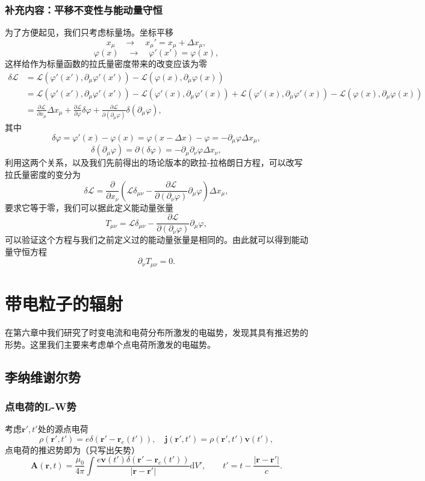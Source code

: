 \documentclass[UTF8]{ctexbook}
\renewcommand{\d}{\mathrm{d}}
\renewcommand{\b}{\boldsymbol}
\numberwithin{equation}{chapter}
\begin{document}
	\subsection{补充内容：平移不变性与能动量守恒}
	为了方便起见，我们只考虑标量场。坐标平移
	\[x_\mu\quad \rightarrow \quad x_\mu'=x_\mu + \Delta x_\mu , \]
	\[\varphi(x)\quad\rightarrow\quad \varphi'(x')=\varphi(x), \]
	这样给作为标量函数的拉氏量密度带来的改变应该为零
	\begin{align*}
		\delta \mathcal{L}&=\mathcal{L}(\varphi'(x'),\partial_\mu\varphi'(x'))-\mathcal{L}(\varphi(x),\partial_\mu\varphi(x)) \\
		&=\mathcal{L}(\varphi'(x'),\partial_\mu\varphi'(x'))-\mathcal{L}(\varphi'(x),\partial_\mu\varphi'(x))+\mathcal{L}(\varphi'(x),\partial_\mu\varphi'(x))-\mathcal{L}(\varphi(x),\partial_\mu\varphi(x)) \\
		&=\frac{\partial \mathcal{L}}{\partial x_\mu}\Delta x_\mu + \frac{\partial \mathcal{L}}{\partial \varphi}\delta \varphi + \frac{\partial \mathcal{L}}{\partial (\partial_\mu \varphi)}\delta(\partial_\mu \varphi), 
	\end{align*}
	其中
	\[\delta \varphi=\varphi'(x)-\varphi(x)=\varphi(x-\Delta x)-\varphi=-\partial_\mu\varphi \Delta x_\mu,\]
	\[\delta(\partial_\mu \varphi)=\partial(\delta \varphi)=-\partial_\mu\partial_\nu\varphi\Delta x_\nu,\]
	利用这两个关系，以及我们先前得出的场论版本的欧拉-拉格朗日方程，可以改写拉氏量密度的变分为
	\[\delta\mathcal{L}=\frac{\partial }{\partial x_\nu}\left(\mathcal{L}\delta_{\mu\nu}-\frac{\partial \mathcal{L}}{\partial (\partial_\nu\varphi)}\partial_\mu\varphi\right)\Delta x_\mu,\]
	要求它等于零，我们可以据此定义能动量张量
	\[T_{\mu\nu}=\mathcal{L}\delta_{\mu\nu}-\frac{\partial \mathcal{L}}{\partial (\partial_\nu\varphi)}\partial_\mu\varphi,\]
	可以验证这个方程与我们之前定义过的能动量张量是相同的。由此就可以得到能动量守恒方程
	\[\partial_\nu T_{\mu\nu}=0.\]
	
	
	\chapter{带电粒子的辐射}
	在第六章中我们研究了时变电流和电荷分布所激发的电磁势，发现其具有推迟势的形势。这里我们主要来考虑单个点电荷所激发的电磁势。
	
	\section{李纳维谢尔势}
	
	\subsection{点电荷的L-W势}
	考虑$\b{r}',t'$处的源点电荷
	\[\rho(\b{r}',t')=e\delta(\b{r}'-\b{r}_e(t')),\quad \b{j}(\b{r}',t')=\rho(\b{r}',t')\b{v}(t'),\]
	点电荷的推迟势即为（只写出矢势）
	\[\b{A}(\b{r},t)=\frac{\mu_0}{4\pi}\int \frac{e\b{v}(t')\delta(\b{r}'-\b{r}_e(t'))}{|\b{r}-\b{r}
	'|}\d V',\qquad t'=t-\frac{|\b{r}-\b{r}'|}{c}.\]
	
\end{document}
